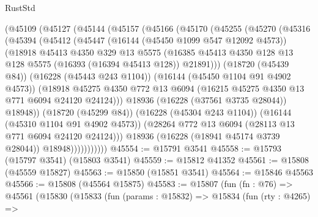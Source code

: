 \begin{lexlean}{RustStd}
\begin{coremodule}
            (@45109
              (@45127
                (@45144
                  (@45157
                    (@45166
                      (@45170
                        (@45255
                          (@45270
                            (@45316
                              (@45394
                                (@45412
                                  (@45447
                                    (@16144 (@45450 @1099 @547 @12092 @4573))
                                    (@18918
                                      @45413
                                      @4350
                                      @329
                                      @13
                                      @5575
                                      (@16385
                                        @45413
                                        @4350
                                        @128
                                        @13
                                        @128
                                        @5575
                                        (@16393 (@16394 @45413 @128))
                                        @21891)))
                                  (@18720 (@45439 @84))
                                  (@16228 (@45443 @243 @1104))
                                  (@16144 (@45450 @1104 @91 @4902 @4573))
                                  (@18918
                                    @45275
                                    @4350
                                    @772
                                    @13
                                    @6094
                                    (@16215 @45275 @4350 @13 @771 @6094 @24120 @24124)))
                                @18936
                                (@16228 (@37561 @3735 @28044))
                                @18948))
                            (@18720 (@45299 @84))
                            (@16228 (@45304 @243 @1104))
                            (@16144 (@45310 @1104 @91 @4902 @4573))
                            (@28264 @772 @13 @6094 (@28113 @13 @771 @6094 @24120 @24124)))
                          @18936
                          (@16228 (@18941 @45174 @3739 @28044))
                          @18948)))))))))))
@45554 := @15791 @3541
@45558 := @15793 (@15797 @3541) (@15803 @3541)
@45559 := @15812 @41352
@45561 := @15808 (@45559 @15827)
@45563 := @15850 (@15851 @3541)
@45564 := @15846 @45563
@45566 := @15808 (@45564 @15875)
@45583 := @15807
    (fun (fn : @76) =>
    @45561
      (@15830
        (@15833
          (fun (params : @15832) =>
          @15834
            (fun (rty : @4265) =>

\end{coremodule}
\end{lexlean}
